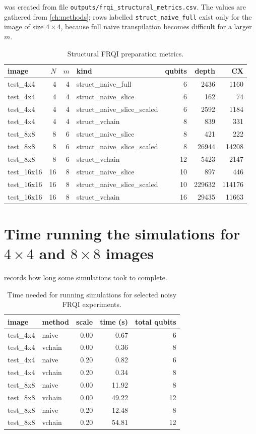  was created from file \texttt{outputs/frqi\_structural\_metrics.csv}. The values are gathered from \cref{ch:methods}; rows labelled \texttt{struct\_naive\_full} exist only for the image of size $4\times 4$, because full naive transpilation becomes difficult for a larger $m$.
\begin{table}[htbp]
\centering
\caption{Structural FRQI preparation metrics.}
\label{tab:struct-csv}
\scriptsize
\begin{tabular}{@{}lrrlrrr@{}}
\toprule
image & $N$ & $m$ & kind & qubits & depth & CX \\
\midrule
test\_4x4 & 4 & 4 & struct\_naive\_full & 6 & 2436 & 1160 \\
test\_4x4 & 4 & 4 & struct\_naive\_slice & 6 & 162 & 74 \\
test\_4x4 & 4 & 4 & struct\_naive\_slice\_scaled & 6 & 2592 & 1184 \\
test\_4x4 & 4 & 4 & struct\_vchain & 8 & 839 & 331 \\
test\_8x8 & 8 & 6 & struct\_naive\_slice & 8 & 421 & 222 \\
test\_8x8 & 8 & 6 & struct\_naive\_slice\_scaled & 8 & 26944 & 14208 \\
test\_8x8 & 8 & 6 & struct\_vchain & 12 & 5423 & 2147 \\
test\_16x16 & 16 & 8 & struct\_naive\_slice & 10 & 897 & 446 \\
test\_16x16 & 16 & 8 & struct\_naive\_slice\_scaled & 10 & 229632 & 114176 \\
test\_16x16 & 16 & 8 & struct\_vchain & 16 & 29435 & 11663 \\
\bottomrule
\end{tabular}
\end{table}

\chapter{Time running the simulations for $4\times4$ and $8\times8$ images}

 records how long some simulations took to complete.
\begin{table}[htbp]
\centering
\caption{Time needed for running simulations for selected noisy FRQI experiments.}
\label{tab:wallclock}
\footnotesize
\begin{tabular}{@{}llrrr@{}}
\toprule
image & method & scale & time (s) & total qubits \\
\midrule
test\_4x4 & naive & 0.00 & 0.67 & 6 \\
test\_4x4 & vchain & 0.00 & 0.36 & 8 \\
test\_4x4 & naive & 0.20 & 0.82 & 6 \\
test\_4x4 & vchain & 0.20 & 0.34 & 8 \\
test\_8x8 & naive & 0.00 & 11.92 & 8 \\
test\_8x8 & vchain & 0.00 & 49.22 & 12 \\
test\_8x8 & naive & 0.20 & 12.48 & 8 \\
test\_8x8 & vchain & 0.20 & 54.81 & 12 \\
\bottomrule
\end{tabular}
\end{table}

